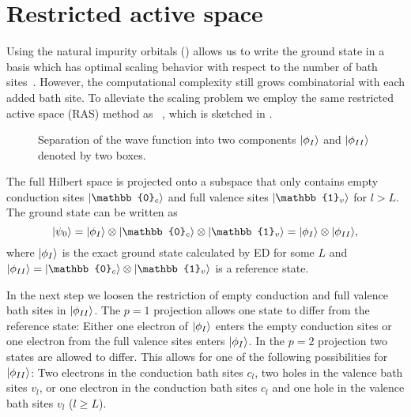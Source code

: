 \section{Restricted active space}%
\label{sec:ras}


Using the natural impurity orbitals () allows us to
write the ground state in a basis which has optimal scaling behavior with respect to
the number of bath sites~\cite{Lu2019}.
However, the computational complexity still grows combinatorial with each added bath site.
To alleviate the scaling problem we employ the same restricted active space (RAS) method
as \citeauthor{Lu2019}~\cite{Lu2019}, which is sketched in .

\begin{figure}[ht]
    \centering
    
    \caption{
        Separation of the wave function into two components
        $\lvert\phi_I\rangle$ and $\lvert\phi_{II}\rangle$ denoted by two boxes.
    }%
    \label{fig:aim-separation}
\end{figure}

The full Hilbert space is projected onto a subspace that only contains
empty conduction sites $\ket{\mathbb{0}_c}$
and full valence sites $\ket{\mathbb{1}_v}$ for $l>L$.
The ground state can be written as
\begin{equation}
    \ket{\psi_0}
    =
    \ket{\phi_I} \otimes \ket{\mathbb{0}_c} \otimes \ket{\mathbb{1}_v}
    =
    \ket{\phi_I} \otimes \ket{\phi_{II}},
\end{equation}
where $\lvert\phi_I\rangle$ is the exact ground state calculated by ED for some $L$
and $\ket{\phi_{II}} = \ket{\mathbb{0}_c} \otimes \ket{\mathbb{1}_v}$ is a reference state.

In the next step we loosen the restriction of empty conduction and full valence bath sites
in $\lvert\phi_{II}\rangle$.
The $p=1$ projection allows one state to differ from the reference state:
Either one electron of $\lvert\phi_I\rangle$ enters the empty conduction sites
or one electron from the full valence sites enters $\lvert\phi_I\rangle$.
In the $p=2$ projection two states are allowed to differ.
This allows for one of the following possibilities for $\lvert\phi_{II}\rangle$:
Two electrons in the conduction bath sites $c_l$,
two holes in the valence bath sites $v_l$,
or one electron in the conduction bath sites $c_l$
and one hole in the valence bath sites $v_l$ ($l\ge L$).

